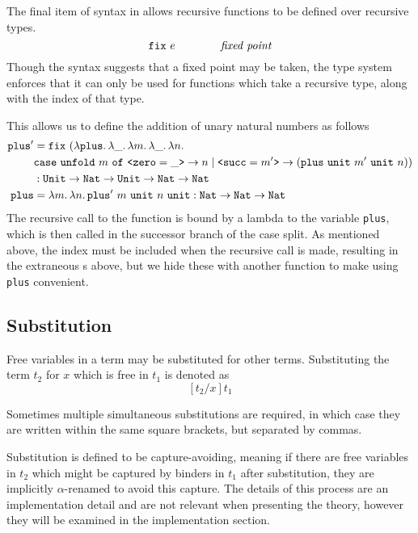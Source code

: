 \documentclass[12pt,a4paper,twoside]{report}
\begin{document}
The final item of syntax in \pimu{} allows recursive functions to be defined over recursive types.
\[
    \mathtt{fix}\ e \qquad\qquad\textit{fixed point}
\]
Though the syntax suggests that a fixed point may be taken, the type system enforces that it can only be used for functions which take a recursive type, along with the index of that type.

This allows us to define the addition of unary natural numbers as follows
\begin{align*}
    \texttt{plus}' &= \fix{(\fun{\texttt{plus}}{\fun{\_}{\fun{m}{\fun{\_}{\fun{n}{\\
        &\texttt{case}\ \unfold{m}\ \texttt{of}\ \texttt{<}\texttt{zero} = \_\texttt{>} \rightarrow n
        \mid \texttt{<}\texttt{succ} = m'\texttt{>} \rightarrow (\app{\app{\app{\app{\texttt{plus}}{\unit{}}}{m'}}{\unit{}}}{n})
    }}}}})}
    \\
    &: \upi{\Unit}{\upi{\texttt{Nat}}{\upi{\Unit}{\upi{\texttt{Nat}}{\texttt{Nat}}}}} \\
    \texttt{plus} &= \annot{\fun{m}{\fun{n}{\app{\texttt{plus}'}{\app{\app{m}{\unit}}{\app{n}{\unit}}}}}}{\upi{\texttt{Nat}}{\upi{\texttt{Nat}}{\texttt{Nat}}}}
\end{align*}
The recursive call to the function is bound by a lambda to the variable \texttt{plus}, which is then called in the successor branch of the case split.
As mentioned above, the index must be included when the recursive call is made, resulting in the extraneous \unit{}s above, but we hide these with another function to make using \texttt{plus} convenient.

\subsection{Substitution}

Free variables in a term may be substituted for other terms.
Substituting the term \(t_2\) for \(x\) which is free in \(t_1\) is denoted as
\[
    [t_2 / x] t_1
\]

Sometimes multiple simultaneous substitutions are required, in which case they are written within the same square brackets, but separated by commas.

Substitution is defined to be capture-avoiding, meaning if there are free variables in \(t_2\) which might be captured by binders in \(t_1\) after substitution, they are implicitly \(\alpha\)-renamed to avoid this capture.
The details of this process are an implementation detail and are not relevant when presenting the theory, however they will be examined in the implementation section.
\end{document}
